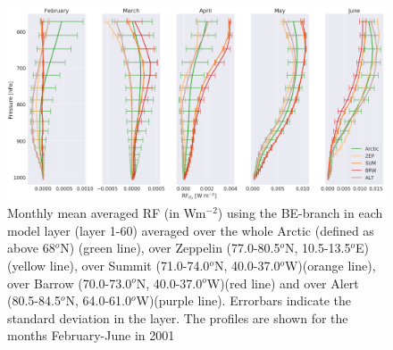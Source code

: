 \begin{figure}[ht]
    \centering
    \includegraphics[width = \linewidth]{Chapter6_Results/images/RF/RF_USE/vert_RF_2001_BE.png}
    \caption{Monthly mean averaged RF (in Wm$^{-2}$) using the BE-branch in each model layer (layer 1-60) averaged over the whole Arctic (defined as above 68$^o$N) (green line), over Zeppelin (77.0-80.5$^o$N, 10.5-13.5$^o$E) (yellow line), over Summit (71.0-74.0$^o$N, 40.0-37.0$^o$W)(orange line), over Barrow (70.0-73.0$^o$N, 40.0-37.0$^o$W)(red line) and over Alert (80.5-84.5$^o$N, 64.0-61.0$^o$W)(purple line). Errorbars indicate the standard deviation in the layer. The profiles are shown for the months February-June in 2001}
    \label{fig:vert_RF_2001}
\end{figure}